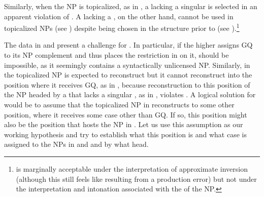 \documentclass[output=paper,modfonts,newtxmath,hidelinks]{langscibook}
\begin{document}
\noindent Similarly, when the NP is topicalized, as in , a  lacking a singular  is selected in an apparent violation of . A  lacking a  , on the other hand, cannot be used in topicalized NPs (see ) despite being chosen in the structure prior to  (see ).\footnote{\label{18:fn8} is marginally acceptable under the interpretation of approximate inversion (although this  still feels like resulting from a production error) but not under the interpretation and intonation associated with the  of the NP.}

\ea \label{18:ex10}
	\z
\z

\noindent The data in  and  present a challenge for . In particular, if the higher  assigns GQ to its NP complement and thus places the restriction in  on it,  should be impossible, as it seemingly contains a syntactically unlicensed NP. Similarly, in  the topicalized NP is expected to reconstruct but it cannot reconstruct into the position where it receives GQ, as in , because reconstruction to this position of the NP headed by a  that lacks a singular , as in , violates . A logical solution for  would be to assume that the topicalized NP in  reconstructs to some other position, where it receives some case other than GQ. If so, this position might also be the position that hosts the NP in . Let us use this assumption as our working hypothesis and try to establish what this position is and what case is assigned to the NPs in  and  and by what head. 
\end{document}
